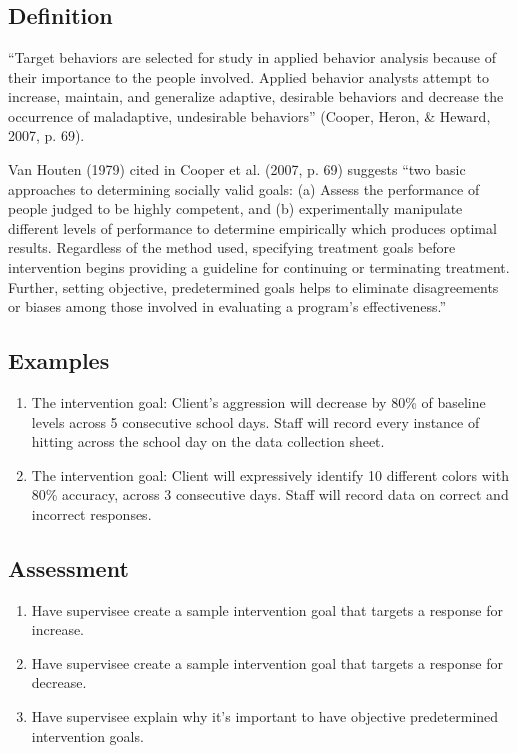 \clearpage \section[\fourjOne{}]{\fourjOne{}%
              }
\subsection{Definition}
``Target behaviors are selected for study in applied behavior analysis because of their importance to the people involved. Applied behavior analysts attempt to increase, maintain, and generalize adaptive, desirable behaviors and decrease the occurrence of maladaptive, undesirable behaviors'' (Cooper, Heron, \& Heward, 2007, p. 69).

Van Houten (1979) cited in Cooper et al. (2007, p. 69) suggests ``two basic approaches to determining socially valid goals: (a) Assess the performance of people judged to be highly competent, and (b) experimentally manipulate different levels of performance to determine empirically which produces optimal results. Regardless of the method used, specifying treatment goals before intervention begins providing a guideline for continuing or terminating treatment. Further, setting objective, predetermined goals helps to eliminate disagreements or biases among those involved in evaluating a program's effectiveness.''
%
\subsection{Examples}
\begin{enumerate}
\item The intervention goal: Client's aggression will decrease by 80\% of baseline levels across 5 consecutive school days. Staff will record every instance of hitting across the school day on the data collection sheet. 
\item The intervention goal: Client will expressively identify 10 different colors with 80\% accuracy, across 3 consecutive days. Staff will record data on correct and incorrect responses.
\end{enumerate}
%
\subsection{Assessment}
\begin{enumerate}
\item Have supervisee create a sample intervention goal that targets a response for increase. 
\item Have supervisee create a sample intervention goal that targets a response for decrease.
\item Have supervisee explain why it's important to have objective predetermined intervention goals.
\end{enumerate}
%
